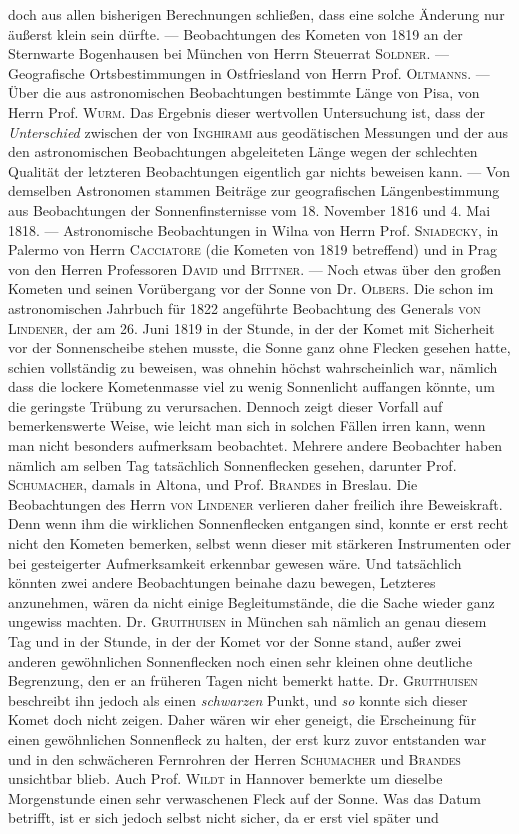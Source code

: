 doch aus allen bisherigen Berechnungen schließen, dass eine solche Änderung nur äußerst klein sein dürfte. --- Beobachtungen des Kometen von 1819 an der Sternwarte Bogenhausen bei München von Herrn Steuerrat \textsc{Soldner}. --- Geografische Ortsbestimmungen in Ostfriesland von Herrn Prof. \textsc{Oltmanns}. --- Über die aus astronomischen Beobachtungen bestimmte Länge von Pisa, von Herrn Prof. \textsc{Wurm}. Das Ergebnis dieser wertvollen Untersuchung ist, dass der \emph{Unterschied} zwischen der von \textsc{Inghirami} aus geodätischen Messungen und der aus den astronomischen Beobachtungen abgeleiteten Länge wegen der schlechten Qualität der letzteren Beobachtungen eigentlich gar nichts beweisen kann. --- Von demselben Astronomen stammen Beiträge zur geografischen Längenbestimmung aus Beobachtungen der Sonnenfinsternisse vom 18. November 1816 und 4. Mai 1818. --- Astronomische Beobachtungen in Wilna von Herrn Prof. \textsc{Sniadecky}, in Palermo von Herrn \textsc{Cacciatore} (die Kometen von 1819 betreffend) und in Prag von den Herren Professoren \textsc{David} und \textsc{Bittner}. --- Noch etwas über den großen Kometen und seinen Vorübergang vor der Sonne von Dr. \textsc{Olbers}. Die schon im astronomischen Jahrbuch für 1822 angeführte Beobachtung des Generals \textsc{von Lindener}, der am 26. Juni 1819 in der Stunde, in der der Komet mit Sicherheit vor der Sonnenscheibe stehen musste, die Sonne ganz ohne Flecken gesehen hatte, schien vollständig zu beweisen, was ohnehin höchst wahrscheinlich war, nämlich dass die lockere Kometenmasse viel zu wenig Sonnenlicht auffangen könnte, um die geringste Trübung zu verursachen. Dennoch zeigt dieser Vorfall auf bemerkenswerte Weise, wie leicht man sich in solchen Fällen irren kann, wenn man nicht besonders aufmerksam beobachtet. Mehrere andere Beobachter haben nämlich am selben Tag tatsächlich Sonnenflecken gesehen, darunter Prof. \textsc{Schumacher}, damals in Altona, und Prof. \textsc{Brandes} in Breslau. Die Beobachtungen des Herrn \textsc{von Lindener} verlieren daher freilich ihre Beweiskraft. Denn wenn ihm die wirklichen Sonnenflecken entgangen sind, konnte er erst recht nicht den Kometen bemerken, selbst wenn dieser mit stärkeren Instrumenten oder bei gesteigerter Aufmerksamkeit erkennbar gewesen wäre. Und tatsächlich könnten zwei andere Beobachtungen beinahe dazu bewegen, Letzteres anzunehmen, wären da nicht einige Begleitumstände, die die Sache wieder ganz ungewiss machten. Dr. \textsc{Gruithuisen} in München sah nämlich an genau diesem Tag und in der Stunde, in der der Komet vor der Sonne stand, außer zwei anderen gewöhnlichen Sonnenflecken noch einen sehr kleinen ohne deutliche Begrenzung, den er an  früheren Tagen nicht bemerkt hatte. Dr. \textsc{Gruithuisen} beschreibt ihn jedoch als einen \emph{schwarzen} Punkt, und \emph{so} konnte sich dieser Komet doch nicht zeigen. Daher wären wir eher geneigt, die Erscheinung für einen gewöhnlichen Sonnenfleck zu halten, der erst kurz zuvor entstanden war und in den schwächeren Fernrohren der Herren \textsc{Schumacher} und \textsc{Brandes} unsichtbar blieb. Auch Prof. \textsc{Wildt} in Hannover bemerkte um dieselbe Morgenstunde einen sehr verwaschenen Fleck auf der Sonne. Was das Datum betrifft, ist er sich jedoch selbst nicht sicher, da er erst viel später und 